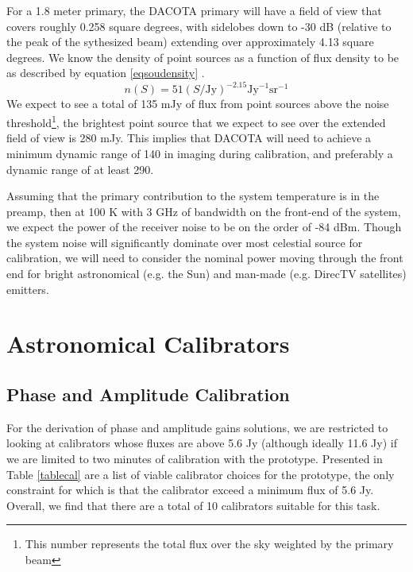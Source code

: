 \documentclass[preprint]{aastex}
\begin{document}
For a 1.8 meter primary, the DACOTA primary will have a field of view that covers roughly 0.258 square degrees, with sidelobes down to -30 dB (relative to the peak of the sythesized beam) extending over approximately 4.13 square degrees. We know the density of point sources as a function of flux density to be as described by equation \ref{eqsoudensity}\citep{MNR20109C}
.
\begin{equation} \label{eqsoudensity}
n(S)=51 (S/\text{Jy})^{-2.15} \text{Jy}^{-1} \text{sr}^{-1}
\end{equation}
We expect to see a total of 135 mJy of flux from point sources above the noise threshold\footnote{This number represents the total flux over the sky weighted by the primary beam}, the brightest point source that we expect to see over the extended field of view is 280 mJy. This implies that DACOTA will need to achieve a minimum dynamic range of 140 in imaging during calibration, and preferably a dynamic range of at least 290.

Assuming that the primary contribution to the system temperature is in the preamp, then at 100 K with 3 GHz of bandwidth on the front-end of the system, we expect the power of the receiver noise to be on the order of -84 dBm. Though the system noise will significantly dominate over most celestial source for calibration, we will need to consider the nominal power moving through the front end for bright astronomical (e.g. the Sun) and man-made (e.g. DirecTV satellites) emitters.

\section{Astronomical Calibrators}\label{seccalibrate}


\subsection{Phase and Amplitude Calibration}\label{ssecphamp}
For the derivation of phase and amplitude gains solutions, we are restricted to looking at calibrators whose fluxes are above 5.6 Jy (although ideally 11.6 Jy) if we are limited to two minutes of calibration with the prototype. Presented in Table \ref{tablecal} are a list of viable calibrator choices for the prototype, the only constraint for which is that the calibrator exceed a minimum flux of 5.6 Jy. Overall, we find that there are a total of 10 calibrators suitable for this task.
\end{document}
